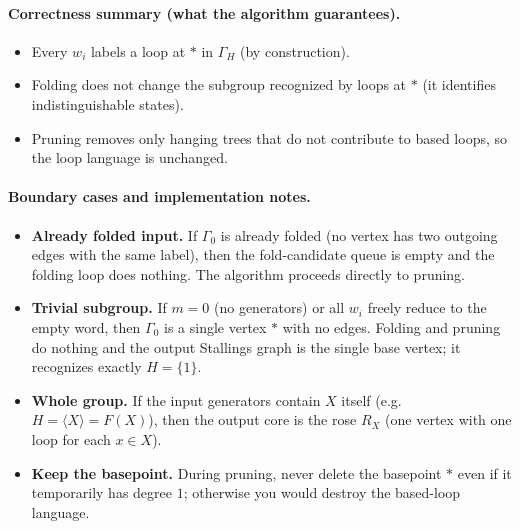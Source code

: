 \documentclass[11pt]{article}
\theoremstyle{definition}
\theoremstyle{plain}
\theoremstyle{remark}
\begin{document}
\paragraph{Correctness summary (what the algorithm guarantees).}
\begin{itemize}[leftmargin=2em]
\item Every $w_i$ labels a loop at $*$ in $\Gamma_H$ (by construction).
\item Folding does not change the subgroup recognized by loops at $*$ (it identifies indistinguishable states).
\item Pruning removes only hanging trees that do not contribute to based loops, so the loop language is unchanged.
\end{itemize}

\paragraph{Boundary cases and implementation notes.}
\begin{itemize}[leftmargin=2em]
\item \textbf{Already folded input.} If $\Gamma_0$ is already folded (no vertex has two outgoing edges with the same label), then the fold-candidate queue is empty and the folding loop does nothing. The algorithm proceeds directly to pruning.
\item \textbf{Trivial subgroup.} If $m=0$ (no generators) or all $w_i$ freely reduce to the empty word, then $\Gamma_0$ is a single vertex $*$ with no edges. Folding and pruning do nothing and the output Stallings graph is the single base vertex; it recognizes exactly $H=\{1\}$.
\item \textbf{Whole group.} If the input generators contain $X$ itself (e.g.\ $H=\langle X\rangle=F(X)$), then the output core is the rose $R_X$ (one vertex with one loop for each $x\in X$).
\item \textbf{Keep the basepoint.} During pruning, never delete the basepoint $*$ even if it temporarily has degree $1$; otherwise you would destroy the based-loop language.
\end{itemize}
\end{document}
